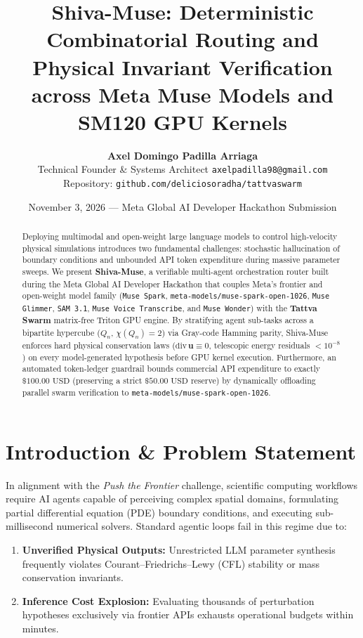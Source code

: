 \documentclass[10pt,twocolumn,letterpaper]{article}
\title{\textbf{Shiva-Muse: Deterministic Combinatorial Routing and Physical Invariant Verification across Meta Muse Models and SM120 GPU Kernels}}
\author{
  \textbf{Axel Domingo Padilla Arriaga} \\
  Technical Founder \& Systems Architect \quad \texttt{axelpadilla98@gmail.com} \\
  Repository: \texttt{github.com/deliciosoradha/tattvaswarm}
}
\date{November 3, 2026 --- Meta Global AI Developer Hackathon Submission}
\begin{document}
\maketitle

\begin{abstract}
Deploying multimodal and open-weight large language models to control high-velocity physical simulations introduces two fundamental challenges: stochastic hallucination of boundary conditions and unbounded API token expenditure during massive parameter sweeps. We present \textbf{Shiva-Muse}, a verifiable multi-agent orchestration router built during the Meta Global AI Developer Hackathon that couples Meta's frontier and open-weight model family (\texttt{Muse Spark}, \texttt{meta-models/muse-spark-open-1026}, \texttt{Muse Glimmer}, \texttt{SAM 3.1}, \texttt{Muse Voice Transcribe}, and \texttt{Muse Wonder}) with the \textbf{Tattva Swarm} matrix-free Triton GPU engine. By stratifying agent sub-tasks across a bipartite hypercube ($Q_n$, $\chi(Q_n)=2$) via Gray-code Hamming parity, Shiva-Muse enforces hard physical conservation laws ($\text{div}\,\mathbf{u} \equiv 0$, telescopic energy residuals $< 10^{-8}$) on every model-generated hypothesis before GPU kernel execution. Furthermore, an automated token-ledger guardrail bounds commercial API expenditure to exactly $\$100.00\text{ USD}$ (preserving a strict $\$50.00\text{ USD}$ reserve) by dynamically offloading parallel swarm verification to \texttt{meta-models/muse-spark-open-1026}.
\end{abstract}

\section{Introduction \& Problem Statement}
In alignment with the \textit{Push the Frontier} challenge, scientific computing workflows require AI agents capable of perceiving complex spatial domains, formulating partial differential equation (PDE) boundary conditions, and executing sub-millisecond numerical solvers. Standard agentic loops fail in this regime due to:
\begin{enumerate}
    \item \textbf{Unverified Physical Outputs:} Unrestricted LLM parameter synthesis frequently violates Courant--Friedrichs--Lewy (CFL) stability or mass conservation invariants.
    \item \textbf{Inference Cost Explosion:} Evaluating thousands of perturbation hypotheses exclusively via frontier APIs exhausts operational budgets within minutes.
\end{enumerate}
\end{document}
